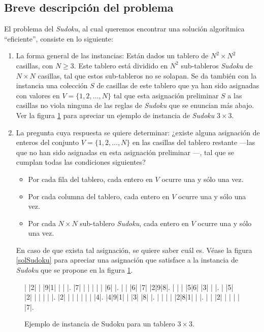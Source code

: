 \documentclass[12pt,lettersize,oneside]{article}
\begin{document}
\subsection{Breve descripción del problema} 

El problema del \emph{Sudoku}, al cual queremos encontrar una solución
algorítmica ``eficiente'', consiste en lo siguiente:\vspace{-2.5mm}
\begin{enumerate}
\item La forma general de las instancias: Están dados un tablero de $N^2 \times
  N^2$ casillas, con $N\geq 3$. Este tablero está dividido en $N^2$ sub-tableros
  \emph{Sudoku} de $N \times N$ casillas, tal que estos sub-tableros no se
  solapan. Se da también con la instancia una colección $S$ de casillas de este
  tablero que ya han sido asignadas con valores en $V=\{1,2,\ldots,N\}$ tal que
  esta asignación preliminar $S$ a las casillas no viola ninguna de las reglas
  de \emph{Sudoku} que se enuncian más abajo. Ver la figura
  \ref{instanciaSudoku} para apreciar un ejemplo de instancia de \emph{Sudoku}
  $3 \times 3$.

  \item La pregunta cuya respuesta se quiere determinar: ¿existe alguna
    asignación de enteros del conjunto $V=\{1,2,\ldots,N\}$ en las casillas del
    tablero restante ---las que no han sido asignadas en esta asignación
    preliminar ---, tal que se cumplan todas las condiciones siguientes?
    \begin{itemize}
    \item Por cada fila del tablero, cada entero en $V$ ocurre una y sólo una
      vez.
    \item Por cada columna del tablero, cada entero en $V$ ocurre una y sólo una
      vez.
    \item Por cada $N \times N$ sub-tablero \emph{Sudoku}, cada entero en $V$
      ocurre una y sólo una vez.
    \end{itemize}
    En caso de que exista tal asignación, se quiere saber cuál es. Véase la
    figura \ref{solSudoku} para apreciar una asignación que satisface a la
    instancia de \emph{Sudoku} que se propone en la figura
    \ref{instanciaSudoku}. 
\end{enumerate}
\begin{figure}\caption{Ejemplo de instancia de Sudoku para un tablero $3 \times 3$.}
\label{instanciaSudoku}
\setlength\sudokusize{6.5cm}
\begin{sudoku}
| |2| | |9|1| | | |.
|7| | | | | | |6| |.
| | |6| |7| |2|9|8|.
| | | |5|6| |3| | |.
| |5| |2| | | | | |.
|2| | | | | | | |4|.
|4|9|1| | |3| |8| |.
| | | | |2|8|1| | |.
| | |2| | | | | |7|.
\end{sudoku}
\end{figure}
\end{document}
